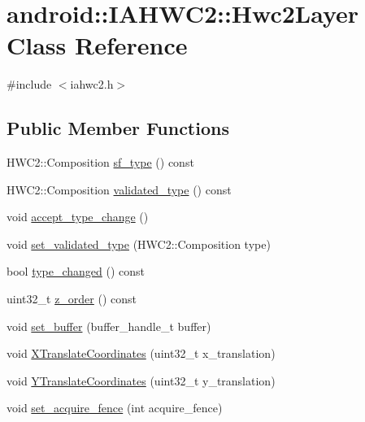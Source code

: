 \hypertarget{classandroid_1_1IAHWC2_1_1Hwc2Layer}{}\section{android\+:\+:I\+A\+H\+WC2\+:\+:Hwc2Layer Class Reference}
\label{classandroid_1_1IAHWC2_1_1Hwc2Layer}


{\ttfamily \#include $<$iahwc2.\+h$>$}

\subsection*{Public Member Functions}
\begin{DoxyCompactItemize}
\item 
H\+W\+C2\+::\+Composition \mbox{\hyperlink{classandroid_1_1IAHWC2_1_1Hwc2Layer_ac39c5bf2230de7659a0dc3c61e3c14d9}{sf\+\_\+type}} () const
\item 
H\+W\+C2\+::\+Composition \mbox{\hyperlink{classandroid_1_1IAHWC2_1_1Hwc2Layer_a2361920d8d15d65eaee2ccb2c57c5623}{validated\+\_\+type}} () const
\item 
void \mbox{\hyperlink{classandroid_1_1IAHWC2_1_1Hwc2Layer_a8aaa19adc3ed5349d78178585bb9cc74}{accept\+\_\+type\+\_\+change}} ()
\item 
void \mbox{\hyperlink{classandroid_1_1IAHWC2_1_1Hwc2Layer_aea68551bf03014f5db39d6eb5bfea003}{set\+\_\+validated\+\_\+type}} (H\+W\+C2\+::\+Composition type)
\item 
bool \mbox{\hyperlink{classandroid_1_1IAHWC2_1_1Hwc2Layer_a21d5564c293990c35601edffc4b9b8b5}{type\+\_\+changed}} () const
\item 
uint32\+\_\+t \mbox{\hyperlink{classandroid_1_1IAHWC2_1_1Hwc2Layer_ab073755e350cf633747e67ac5cff7ee4}{z\+\_\+order}} () const
\item 
void \mbox{\hyperlink{classandroid_1_1IAHWC2_1_1Hwc2Layer_affc53396e897779e83bf3ab80268824c}{set\+\_\+buffer}} (buffer\+\_\+handle\+\_\+t buffer)
\item 
void \mbox{\hyperlink{classandroid_1_1IAHWC2_1_1Hwc2Layer_afec15cb870559a76d049d1e6c4aadde9}{X\+Translate\+Coordinates}} (uint32\+\_\+t x\+\_\+translation)
\item 
void \mbox{\hyperlink{classandroid_1_1IAHWC2_1_1Hwc2Layer_ae6de5e2f3be86c531587dd803f60d653}{Y\+Translate\+Coordinates}} (uint32\+\_\+t y\+\_\+translation)
\item 
void \mbox{\hyperlink{classandroid_1_1IAHWC2_1_1Hwc2Layer_adc68c4adc41b317552bb0a89a0e39ede}{set\+\_\+acquire\+\_\+fence}} (int acquire\+\_\+fence)

\end{DoxyCompactItemize}
